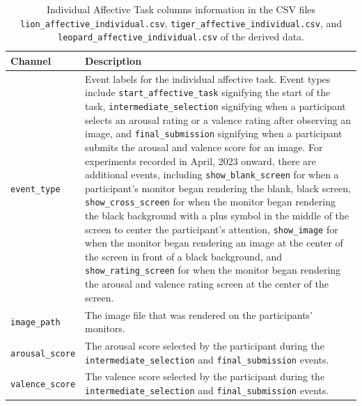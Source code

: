 \begin{table}[h]
\centering
\begin{tabularx}{\textwidth}{lX}
    \toprule
    Channel & Description \\\midrule
    \texttt{event\_type} & Event labels for the individual affective task. Event types include \texttt{start\_affective\_task} signifying the start of the task, \texttt{intermediate\_selection} signifying when a participant selects an arousal rating or a valence rating after observing an image, and \texttt{final\_submission} signifying when a participant submits the arousal and valence score for an image. For experiments recorded in April, 2023 onward, there are additional events, including \texttt{show\_blank\_screen} for when a participant's monitor began rendering the blank, black screen, \texttt{show\_cross\_screen} for when the monitor began rendering the black background with a plus symbol in the middle of the screen to center the participant's attention, \texttt{show\_image} for when the monitor began rendering an image at the center of the screen in front of a black background, and \texttt{show\_rating\_screen} for when the monitor began rendering the arousal and valence rating screen at the center of the screen.\\
    \texttt{image\_path} & The image file that was rendered on the participants' monitors.\\
    \texttt{arousal\_score} & The arousal score selected by the participant during the \texttt{intermediate\_selection} and \texttt{final\_submission} events.\\
    \texttt{valence\_score} & The valence score selected by the participant during the \texttt{intermediate\_selection} and \texttt{final\_submission} events.\\
\bottomrule
\end{tabularx}
\caption{Individual Affective Task columns information in the CSV files \texttt{lion\_affective\_individual.csv}, \texttt{tiger\_affective\_individual.csv}, and \texttt{leopard\_affective\_individual.csv} of the derived data.}
\label{tab:individual_affective_task_columns}
\end{table}

